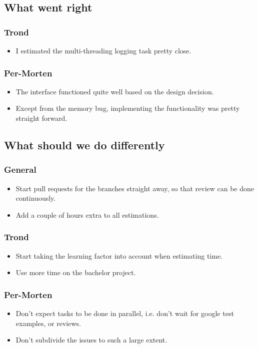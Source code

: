 \documentclass{article}
\begin{document}
\subsection*{What went right}
\subsubsection*{Trond}
\begin{itemize}
    \item 
    I estimated the multi-threading logging task pretty close.
\end{itemize}

\subsubsection*{Per-Morten}
\begin{itemize}
    \item
    The interface functioned quite well based on the design decision.

    \item
    Except from the memory bug, implementing the functionality was pretty straight forward.
\end{itemize}

\subsection*{What should we do differently}
\subsubsection*{General}
\begin{itemize}
    \item
    Start pull requests for the branches straight away, so that review can be done continuously. 
    
    \item
    Add a couple of hours extra to all estimations.
\end{itemize}

\subsubsection*{Trond}
\begin{itemize}
    \item
    Start taking the learning factor into account when estimating time.

    \item
    Use more time on the bachelor project.
\end{itemize}

\subsubsection*{Per-Morten}
\begin{itemize}
    \item
    Don't expect tasks to be done in parallel, i.e. don't wait for google test examples, or reviews.

    \item
    Don't subdivide the issues to such a large extent.

\end{itemize}
\end{document}
